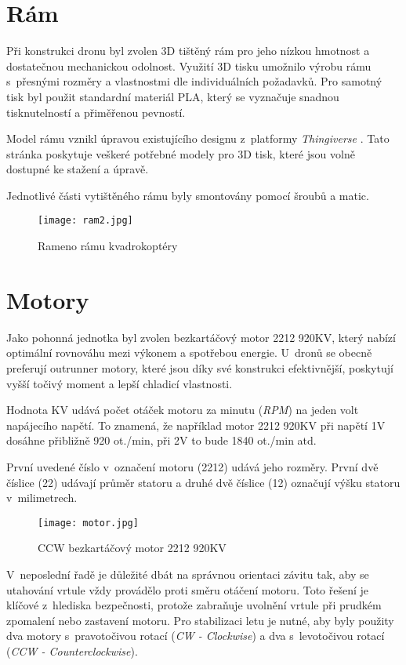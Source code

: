 \documentclass[12pt]{report}
\begin{document}
\section[Rám]{Rám}
Při konstrukci dronu byl zvolen 3D tištěný rám pro jeho nízkou hmotnost a dostatečnou mechanickou odolnost. Využití 3D tisku umožnilo výrobu rámu s~přesnými rozměry a vlastnostmi dle individuálních požadavků. Pro samotný tisk byl použit standardní materiál PLA, který se vyznačuje snadnou tisknutelností a přiměřenou pevností.

Model rámu vznikl úpravou existujícího designu z~platformy \textit{Thingiverse} \cite{ram}. Tato stránka poskytuje veškeré potřebné modely pro 3D tisk, které jsou volně dostupné ke stažení a úpravě.

Jednotlivé části vytištěného rámu byly smontovány pomocí šroubů a matic.

\begin{figure}[H]
	\centering
	\texttt{[image: ram2.jpg]}
	\caption{Rameno rámu kvadrokoptéry}
	\label{fig:ram2.jpg}
\end{figure}

\section[Motory]{Motory}
Jako pohonná jednotka byl zvolen bezkartáčový motor 2212 920KV, který nabízí optimální rovnováhu mezi výkonem a spotřebou energie. U~dronů se obecně preferují outrunner motory, které jsou díky své konstrukci efektivnější, poskytují vyšší točivý moment a lepší chladicí vlastnosti.

Hodnota KV udává počet otáček motoru za minutu (\textit{RPM}) na jeden volt napájecího napětí. To znamená, že například motor 2212 920KV při napětí 1V dosáhne přibližně 920 ot./min, při 2V to bude 1840 ot./min atd.

První uvedené číslo v~označení motoru (2212) udává jeho rozměry. První dvě číslice (22) udávají průměr statoru a druhé dvě číslice (12) označují výšku statoru v~milimetrech.

\begin{figure}[H]
	\centering
	\texttt{[image: motor.jpg]}
	\caption{CCW bezkartáčový motor 2212 920KV}
	\label{fig:motor.jpg}
\end{figure}

V~neposlední řadě je důležité dbát na správnou orientaci závitu tak, aby se utahování vrtule vždy provádělo proti směru otáčení motoru. Toto řešení je klíčové z~hlediska bezpečnosti, protože zabraňuje uvolnění vrtule při prudkém zpomalení nebo zastavení motoru. Pro stabilizaci letu je nutné, aby byly použity dva motory s~pravotočivou rotací (\textit{CW - Clockwise}) a dva s~levotočivou rotací (\textit{CCW - Counterclockwise}). \cite{ol}
\end{document}
